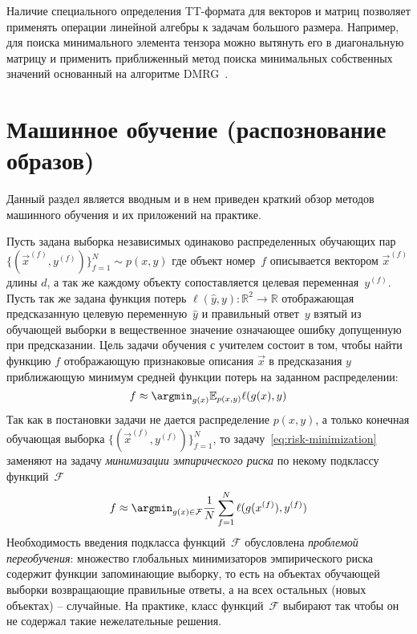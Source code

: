 Наличие специального определения TT\hyp{}формата для векторов и матриц позволяет применять операции линейной алгебры к задачам большого размера. Например, для поиска минимального элемента тензора можно вытянуть его в диагональную матрицу и применить приближенный метод поиска минимальных собственных значений основанный на алгоритме DMRG~\cite{khoromskij2010dmrg}.

\section{Машинное обучение (распознование образов)} \label{sec:ml}
Данный раздел является вводным и в нем приведен краткий обзор методов машинного обучения и их приложений на практике.

Пусть задана выборка независимых одинаково распределенных обучающих пар $\{(\vec{x}^{(f)}, y^{(f)})\}_{f=1}^N \sim p(x, y)$ где объект номер~$f$ описывается вектором $\vec{x}^{(f)}$ длины $d$, а так же каждому объекту сопоставляется целевая переменная~$y^{(f)}$. Пусть так же задана функция потерь $\ell(\widehat{y}, y):\mathbb{R}^2 \to \mathbb{R}$ отображающая предсказанную целевую переменную~$\widehat{y}$ и правильный ответ~$y$ взятый из обучающей выборки в вещественное значение означающее ошибку допущенную при предсказании. Цель задачи обучения с учителем состоит в том, чтобы найти функцию $f$ отображающую признаковые описания $\vec{x}$ в предсказания $y$ приближающую минимум средней функции потерь на заданном распределении:
\begin{equation}
\label{eq:risk-minimization}
f \approx \argmin_{g(x)} \mathbb{E}_{p(x, y)} \ell(g(x), y)	
\end{equation}
Так как в постановки задачи не дается распределение $p(x, y)$, а только конечная обучающая выборка $\{(\vec{x}^{(f)}, y^{(f)})\}_{f=1}^N$, то задачу~\eqref{eq:risk-minimization} заменяют на задачу \emph{минимизации эмпирического риска} по некому подклассу функций~$\mathcal{F}$
\begin{equation}
\label{eq:emprical-risk-minimization}
f \approx \argmin_{g(x) \in \mathcal{F}} \frac{1}{N} \sum_{f=1}^N \ell(g(x^{(f)}), y^{(f)})
\end{equation}
Необходимость введения подкласса функций~$\mathcal{F}$ обусловлена \emph{проблемой переобучения}: множество глобальных минимизаторов эмпирического риска содержит функции запоминающие выборку, то есть на объектах обучающей выборки возвращающие правильные ответы, а на всех остальных (новых объектах) -- случайные. На практике, класс функций~$\mathcal{F}$ выбирают так чтобы он не содержал такие нежелательные решения.

